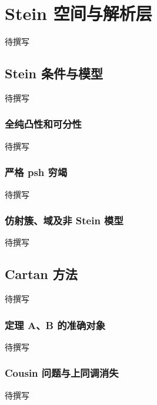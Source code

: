 
% 
% 
% 
% 
% 
% 

\chapter{Stein 空间与解析层}
\label{g4:app:A}

待撰写

\section{Stein 条件与模型}
\label{g4:sec:A01}
待撰写

\subsection{全纯凸性和可分性}
\label{g4:subsec:A01:01}
待撰写

\subsection{严格 psh 穷竭}
\label{g4:subsec:A01:02}
待撰写

\subsection{仿射簇、域及非 Stein 模型}
\label{g4:subsec:A01:03}
待撰写

\section{Cartan 方法}
\label{g4:sec:A02}
待撰写

\subsection{定理 A、B 的准确对象}
\label{g4:subsec:A02:01}
待撰写

\subsection{Cousin 问题与上同调消失}
\label{g4:subsec:A02:02}
待撰写

